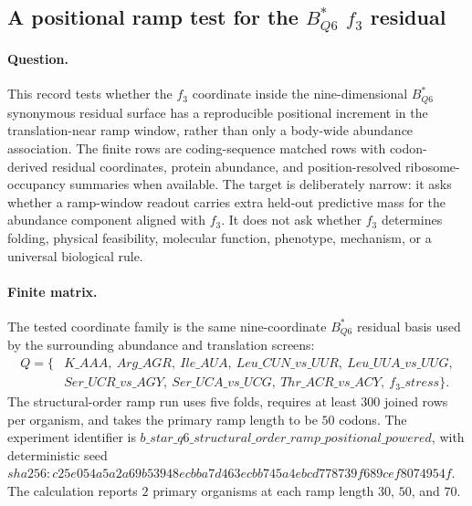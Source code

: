 
\subsection{A positional ramp test for the $B^{*}_{Q6}$ $f_3$ residual}
\label{sec:bioreality-q6-structural-order-ramp-positional}

\paragraph{Question.}
This record tests whether the $f_3$ coordinate inside the nine-dimensional $B^{*}_{Q6}$ synonymous residual surface has a reproducible positional increment in the translation-near ramp window, rather than only a body-wide abundance association. The finite rows are coding-sequence matched rows with codon-derived residual coordinates, protein abundance, and position-resolved ribosome-occupancy summaries when available. The target is deliberately narrow: it asks whether a ramp-window readout carries extra held-out predictive mass for the abundance component aligned with $f_3$. It does not ask whether $f_3$ determines folding, physical feasibility, molecular function, phenotype, mechanism, or a universal biological rule.

\paragraph{Finite matrix.}
The tested coordinate family is the same nine-coordinate $B^{*}_{Q6}$ residual basis used by the surrounding abundance and translation screens:
$$
\begin{aligned}
Q = \{&K\_AAA,\ Arg\_AGR,\ Ile\_AUA,\ Leu\_CUN\_vs\_UUR,\ Leu\_UUA\_vs\_UUG,\\
&Ser\_UCR\_vs\_AGY,\ Ser\_UCA\_vs\_UCG,\ Thr\_ACR\_vs\_ACY,\ f_3\_stress\}.
\end{aligned}
$$
The structural-order ramp run uses five folds, requires at least $300$ joined rows per organism, and takes the primary ramp length to be $50$ codons. The experiment identifier is $b\_star\_q6\_structural\_order\_ramp\_positional\_powered$, with deterministic seed $sha256:c25e054a5a2a69b53948ecbba7d463ecbb745a4ebcd778739f689cef8074954f$. The calculation reports $2$ primary organisms at each ramp length $30$, $50$, and $70$.


